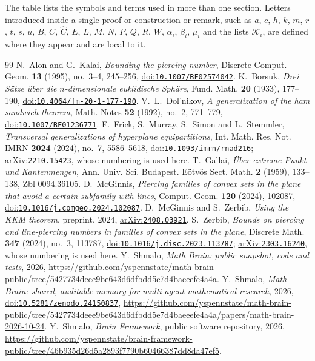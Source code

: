 \documentclass[11pt]{amsart}
\theoremstyle{remark}
\newcommand{\doi}[1]{\href{https://doi.org/#1}{doi:\nolinkurl{#1}}}
\newcommand{\arxiv}[1]{\href{https://arxiv.org/abs/#1}{arXiv:\nolinkurl{#1}}}
\begin{document}
The table lists the symbols and terms used in more than one section. Letters introduced inside a single proof or
construction or remark, such as $a$, $c$, $h$, $k$, $m$, $r$, $t$, $s$, $u$, $B$, $C$, $\hat C$, $E$, $L$, $M$, $N$, $P$,
$Q$, $R$, $W$, $\alpha_i$, $\beta_i$, $\mu_i$ and the lists $\mathcal K_i$, are defined where they appear and are local to it.

\begin{thebibliography}{99}
 N.~Alon and G.~Kalai, \emph{Bounding the piercing number}, Discrete Comput. Geom. \textbf{13} (1995),
no.~3--4, 245--256, \doi{10.1007/BF02574042}.
 K.~Borsuk, \emph{Drei S\"atze \"uber die $n$-dimensionale euklidische Sph\"are}, Fund. Math.
\textbf{20} (1933), 177--190, \doi{10.4064/fm-20-1-177-190}.
 V.~L.~Dol'nikov, \emph{A generalization of the ham sandwich theorem}, Math. Notes \textbf{52} (1992),
no.~2, 771--779, \doi{10.1007/BF01236771}.
 F.~Frick, S.~Murray, S.~Simon and L.~Stemmler, \emph{Transversal generalizations of hyperplane
equipartitions}, Int. Math. Res. Not. IMRN \textbf{2024} (2024), no.~7, 5586--5618, \doi{10.1093/imrn/rnad216};
\arxiv{2210.15423}, whose numbering is used here.
 T.~Gallai, \emph{\"Uber extreme Punkt- und Kantenmengen}, Ann. Univ. Sci. Budapest. E\"otv\"os Sect.
Math. \textbf{2} (1959), 133--138, Zbl 0094.36105.
 D.~McGinnis, \emph{Piercing families of convex sets in the plane that avoid a certain subfamily with
lines}, Comput. Geom. \textbf{120} (2024), 102087, \doi{10.1016/j.comgeo.2024.102087}.
 D.~McGinnis and S.~Zerbib, \emph{Using the KKM theorem}, preprint, 2024, \arxiv{2408.03921}.
 S.~Zerbib, \emph{Bounds on piercing and line-piercing numbers in families of convex sets in the
plane}, Discrete Math. \textbf{347} (2024), no.~3, 113787, \doi{10.1016/j.disc.2023.113787}; \arxiv{2303.16240}, whose numbering is used here.
 Y.~Shmalo, \emph{Math Brain: public snapshot, code and tests}, 2026,
\url{https://github.com/yspennstate/math-brain-public/tree/5427734deee9be643d6dfbdd5e7d4baeeefe4a4a}.
 Y.~Shmalo, \emph{Math Brain: shared, auditable memory for multi-agent mathematical
research}, 2026, \doi{10.5281/zenodo.24150837},
\url{https://github.com/yspennstate/math-brain-public/tree/5427734deee9be643d6dfbdd5e7d4baeeefe4a4a/papers/math-brain-2026-10-24}.
 Y.~Shmalo, \emph{Brain Framework}, public software repository, 2026,
\url{https://github.com/yspennstate/brain-framework-public/tree/46b935d26d5a2893f7790b60466387dd8da47ef5}.
\end{thebibliography}
\end{document}
